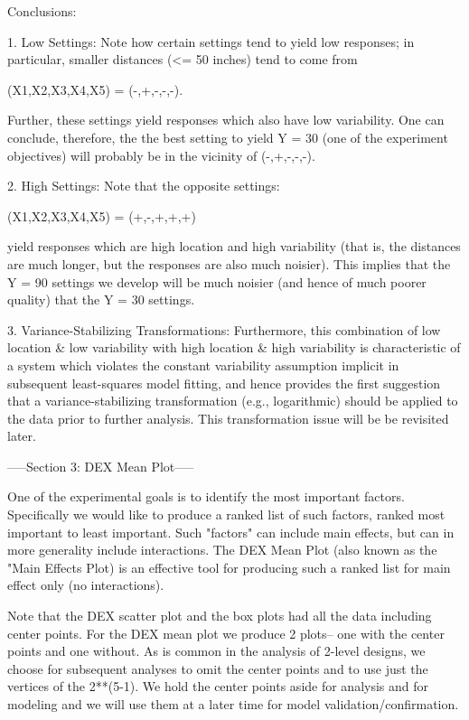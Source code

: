Conclusions:

1. Low Settings: Note how certain settings tend to
   yield low responses; in particular, smaller
   distances (<= 50 inches) tend to come from

          (X1,X2,X3,X4,X5) = (-,+,-,-,-).

   Further, these settings yield responses which
   also have low variability.  One can conclude,
   therefore, the the best setting to yield Y = 30
   (one of the experiment objectives) will
   probably be in the vicinity of (-,+,-,-,-).

2. High Settings: Note that the opposite settings:

          (X1,X2,X3,X4,X5) = (+,-,+,+,+)

   yield responses which are high location and
   high variability (that is, the distances are
   much longer, but the responses are also much
   noisier).  This implies that the Y = 90
   settings we develop will be much noisier (and
   hence of much poorer quality) that the Y = 30
   settings.

3. Variance-Stabilizing Transformations:
   Furthermore, this combination of low location &
   low variability with high location & high
   variability is characteristic of a system which
   violates the constant variability assumption
   implicit in subsequent least-squares model
   fitting, and hence provides the first
   suggestion that a variance-stabilizing
   transformation (e.g., logarithmic) should be
   applied to the data prior to further analysis.
   This transformation issue will be be revisited
   later.

-----Section 3: DEX Mean Plot-----

One of the experimental goals is to identify the most important
factors.  Specifically we would like to produce a ranked list
of such factors, ranked most important to least important.
Such "factors" can include main effects, but can in more generality
include interactions.  The DEX Mean Plot (also known as the "Main
Effects Plot) is an effective tool for producing such a ranked list
for main effect only (no interactions).

Note that the DEX scatter plot and the box plots had all the data
including center points.  For the DEX mean plot we produce 2 plots--
one with the center points and one without.  As is common in the
analysis of 2-level designs, we choose for subsequent analyses
to omit the center points and to use just the vertices of the 2**(5-1).
We hold the center points aside for analysis and for modeling and
we will use them at a later time for model validation/confirmation.

